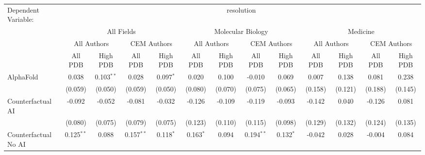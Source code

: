 \begingroup
\centering
\begin{tabular}{lcccccccccccc}
   \tabularnewline \midrule \midrule
   Dependent Variable: & \multicolumn{12}{c}{resolution}\\
 & \multicolumn{4}{c}{All Fields} & \multicolumn{4}{c}{Molecular Biology} & \multicolumn{4}{c}{Medicine} \\
\cmidrule(lr){2-5} \cmidrule(lr){6-9} \cmidrule(lr){10-13}
 & \multicolumn{2}{c}{All Authors} & \multicolumn{2}{c}{CEM Authors} & \multicolumn{2}{c}{All Authors} & \multicolumn{2}{c}{CEM Authors} & \multicolumn{2}{c}{All Authors} & \multicolumn{2}{c}{CEM Authors} \\
\cmidrule(lr){2-3} \cmidrule(lr){4-5} \cmidrule(lr){6-7} \cmidrule(lr){8-9} \cmidrule(lr){10-11} \cmidrule(lr){12-13}
 & \multicolumn{1}{c}{All PDB} & \multicolumn{1}{c}{High PDB} & \multicolumn{1}{c}{All PDB} & \multicolumn{1}{c}{High PDB} & \multicolumn{1}{c}{All PDB} & \multicolumn{1}{c}{High PDB} & \multicolumn{1}{c}{All PDB} & \multicolumn{1}{c}{High PDB} & \multicolumn{1}{c}{All PDB} & \multicolumn{1}{c}{High PDB} & \multicolumn{1}{c}{All PDB} & \multicolumn{1}{c}{High PDB} \\
\cmidrule(lr){2-2} \cmidrule(lr){3-3} \cmidrule(lr){4-4} \cmidrule(lr){5-5} \cmidrule(lr){6-6} \cmidrule(lr){7-7} \cmidrule(lr){8-8} \cmidrule(lr){9-9} \cmidrule(lr){10-10} \cmidrule(lr){11-11} \cmidrule(lr){12-12} \cmidrule(lr){13-13}
   AlphaFold                                                  & 0.038        & 0.103$^{**}$ & 0.028        & 0.097$^{*}$    & 0.020        & 0.100   & -0.010       & 0.069       & 0.007   & 0.138        & 0.081        & 0.238\\   
                                                              & (0.059)      & (0.050)      & (0.059)      & (0.050)        & (0.080)      & (0.070) & (0.075)      & (0.065)     & (0.158) & (0.121)      & (0.188)      & (0.145)\\   
   Counterfactual AI                                          & -0.092       & -0.052       & -0.081       & -0.032         & -0.126       & -0.109  & -0.119       & -0.093      & -0.142  & 0.040        & -0.126       & 0.081\\   
                                                              & (0.080)      & (0.075)      & (0.079)      & (0.075)        & (0.123)      & (0.110) & (0.115)      & (0.098)     & (0.129) & (0.132)      & (0.124)      & (0.135)\\   
   Counterfactual No AI                                       & 0.125$^{**}$ & 0.088        & 0.157$^{**}$ & 0.118$^{*}$    & 0.163$^{*}$  & 0.094   & 0.194$^{**}$ & 0.132$^{*}$ & -0.042  & 0.028        & -0.004       & 0.084\\   

\end{tabular}
